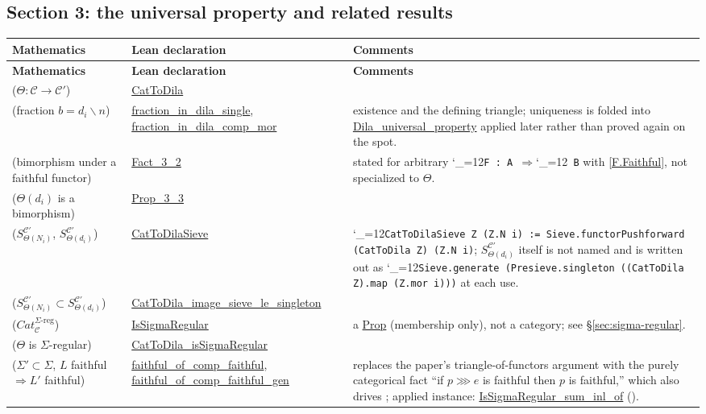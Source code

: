 \documentclass[11pt]{amsart}
\newcommand{\lc}[1]{\url{#1}}
\newcommand{\lcode}{\begingroup\catcode`\_=12\relax\lcodeInner}
\newcommand{\lcodeInner}[1]{\texttt{#1}\endgroup}
\theoremstyle{plain}
\theoremstyle{definition}
\theoremstyle{remark}
\newcommand{\calC}{\mathcal C}
\begin{document}
\subsection{Section 3: the universal property and related results}
\label{sec:dict-3}

\begingroup
\renewcommand{\arraystretch}{1.15}
\begin{longtable}{@{}p{2.55cm}p{4.1cm}p{4.75cm}@{}}
\toprule
\textbf{Mathematics} & \textbf{Lean declaration} & \textbf{Comments} \\
\midrule
\endfirsthead
\toprule
\textbf{Mathematics} & \textbf{Lean declaration} & \textbf{Comments} \\
\midrule
\endhead
\bottomrule
\endfoot
\citep[Proposition~3.1(i)]{Mayeux} ($\Theta : \calC \to \calC'$) & \lc{CatToDila} & \\
\citep[Proposition~3.1(ii)]{Mayeux} (fraction $b=d_i\backslash n$) & \lc{fraction_in_dila_single}, \lc{fraction_in_dila_comp_mor} & existence and the defining triangle; uniqueness is folded into \lc{Dila_universal_property} applied later rather than proved again on the spot. \\
\citep[Fact~3.2]{Mayeux} (bimorphism under a faithful functor) & \lc{Fact_3_2} & stated for arbitrary \lcode{F : A }\ensuremath{\Rightarrow}\lcode{ B} with \lc{[F.Faithful]}, not specialized to $\Theta$. \\
\citep[Proposition~3.3]{Mayeux} ($\Theta(d_i)$ is a bimorphism) & \lc{Prop_3_3} & \\
\citep[Definition~3.4]{Mayeux} ($S^{\calC'}_{\Theta(N_i)}$, $S^{\calC'}_{\Theta(d_i)}$) & \lc{CatToDilaSieve} & \lcode{CatToDilaSieve Z (Z.N i) := Sieve.functorPushforward (CatToDila Z) (Z.N i)}; $S^{\calC'}_{\Theta(d_i)}$ itself is not named and is written out as \lcode{Sieve.generate (Presieve.singleton ((CatToDila Z).map (Z.mor i)))} at each use. \\
\citep[Proposition~3.5]{Mayeux} ($S^{\calC'}_{\Theta(N_i)} \subset S^{\calC'}_{\Theta(d_i)}$) & \lc{CatToDila_image_sieve_le_singleton} & \\
\citep[Definition~3.6]{Mayeux} ($Cat_\calC^{\Sigma\text{-reg}}$) & \lc{IsSigmaRegular} & a \lc{Prop} (membership only), not a category; see \S\ref{sec:sigma-regular}. \\
\citep[Fact~3.7]{Mayeux} ($\Theta$ is $\Sigma$-regular) & \lc{CatToDila_isSigmaRegular} & \\
\citep[Fact~3.8]{Mayeux} ($\Sigma'\subset\Sigma$, $L$ faithful $\Rightarrow L'$ faithful) & \lc{faithful_of_comp_faithful}, \lc{faithful_of_comp_faithful_gen} & replaces the paper's triangle-of-functors argument with the purely categorical fact ``if $p\ggg e$ is faithful then $p$ is faithful,'' which also drives \citep[Fact~3.7]{Mayeux}; applied instance: \lc{IsSigmaRegular_sum_inl_of} (\citep[Proposition~3.15]{Mayeux}). \\

\end{longtable}
\end{document}
